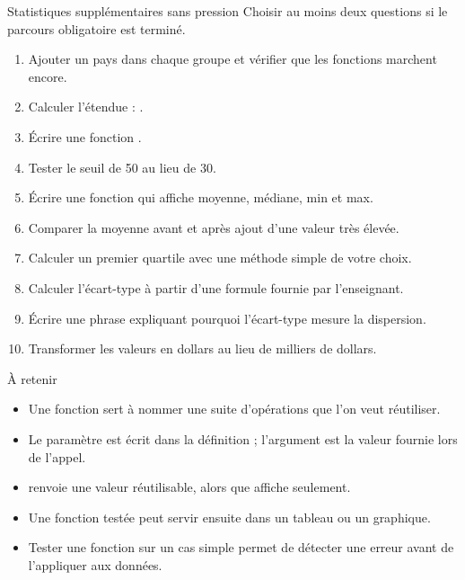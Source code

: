 \documentclass[11pt,a4paper]{article}
\begin{document}
\begin{extensionexercise}{Statistiques supplémentaires sans pression}
Choisir au moins deux questions si le parcours obligatoire est terminé.
\begin{enumerate}
  \item Ajouter un pays dans chaque groupe et vérifier que les fonctions marchent encore.
  \item Calculer l'étendue : .
  \item Écrire une fonction .
  \item Tester le seuil de 50 au lieu de 30.
  \item Écrire une fonction  qui affiche moyenne, médiane, min et max.
  \item Comparer la moyenne avant et après ajout d'une valeur très élevée.
  \item Calculer un premier quartile avec une méthode simple de votre choix.
  \item Calculer l'écart-type à partir d'une formule fournie par l'enseignant.
  \item Écrire une phrase expliquant pourquoi l'écart-type mesure la dispersion.
  \item Transformer les valeurs en dollars au lieu de milliers de dollars.
\end{enumerate}
\end{extensionexercise}

\begin{takeawaybox}{À retenir}
\begin{itemize}
  \item Une fonction sert à nommer une suite d'opérations que l'on veut réutiliser.
  \item Le paramètre est écrit dans la définition ; l'argument est la valeur fournie lors de l'appel.
  \item {} renvoie une valeur réutilisable, alors que  affiche seulement.
  \item Une fonction testée peut servir ensuite dans un tableau ou un graphique.
  \item Tester une fonction sur un cas simple permet de détecter une erreur avant de l'appliquer aux données.
\end{itemize}
\end{takeawaybox}
\end{document}
